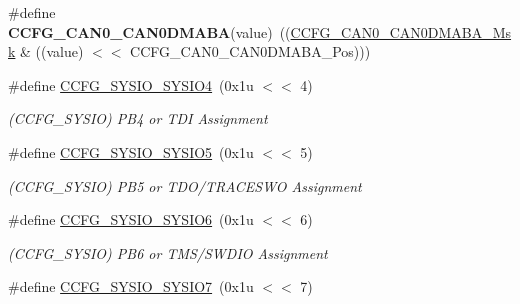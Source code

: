\begin{DoxyCompactItemize}
\mbox{\label{group__SAMV71__MATRIX_ga89c5d24cdba3123084ec2c465a9fdc07}} 
\#define {\bfseries C\+C\+F\+G\+\_\+\+C\+A\+N0\+\_\+\+C\+A\+N0\+D\+M\+A\+BA}(value)~((\mbox{\hyperlink{group__SAMV71__MATRIX_ga16ce309f038c92ae22b3b9ec99610d7c}{C\+C\+F\+G\+\_\+\+C\+A\+N0\+\_\+\+C\+A\+N0\+D\+M\+A\+B\+A\+\_\+\+Msk}} \& ((value) $<$$<$ C\+C\+F\+G\+\_\+\+C\+A\+N0\+\_\+\+C\+A\+N0\+D\+M\+A\+B\+A\+\_\+\+Pos)))
\item 
\mbox{\label{group__SAMV71__MATRIX_ga59a09a374bab5cbed270d5aace8082bc}} 
\#define \mbox{\hyperlink{group__SAMV71__MATRIX_ga59a09a374bab5cbed270d5aace8082bc}{C\+C\+F\+G\+\_\+\+S\+Y\+S\+I\+O\+\_\+\+S\+Y\+S\+I\+O4}}~(0x1u $<$$<$ 4)
\begin{DoxyCompactList}\small\item\em (C\+C\+F\+G\+\_\+\+S\+Y\+S\+IO) P\+B4 or T\+DI Assignment \end{DoxyCompactList}\item 
\mbox{\label{group__SAMV71__MATRIX_ga7700a8793de58ee46189b3af593300ca}} 
\#define \mbox{\hyperlink{group__SAMV71__MATRIX_ga7700a8793de58ee46189b3af593300ca}{C\+C\+F\+G\+\_\+\+S\+Y\+S\+I\+O\+\_\+\+S\+Y\+S\+I\+O5}}~(0x1u $<$$<$ 5)
\begin{DoxyCompactList}\small\item\em (C\+C\+F\+G\+\_\+\+S\+Y\+S\+IO) P\+B5 or T\+D\+O/\+T\+R\+A\+C\+E\+S\+WO Assignment \end{DoxyCompactList}\item 
\mbox{\label{group__SAMV71__MATRIX_ga2ed6a8e8801f4a9f5751e5cdaa6a7615}} 
\#define \mbox{\hyperlink{group__SAMV71__MATRIX_ga2ed6a8e8801f4a9f5751e5cdaa6a7615}{C\+C\+F\+G\+\_\+\+S\+Y\+S\+I\+O\+\_\+\+S\+Y\+S\+I\+O6}}~(0x1u $<$$<$ 6)
\begin{DoxyCompactList}\small\item\em (C\+C\+F\+G\+\_\+\+S\+Y\+S\+IO) P\+B6 or T\+M\+S/\+S\+W\+D\+IO Assignment \end{DoxyCompactList}\item 
\mbox{\label{group__SAMV71__MATRIX_ga28b95aaca8e016fcacd6042b589a1084}} 
\#define \mbox{\hyperlink{group__SAMV71__MATRIX_ga28b95aaca8e016fcacd6042b589a1084}{C\+C\+F\+G\+\_\+\+S\+Y\+S\+I\+O\+\_\+\+S\+Y\+S\+I\+O7}}~(0x1u $<$$<$ 7)
$$
\end{DoxyCompactItemize}
